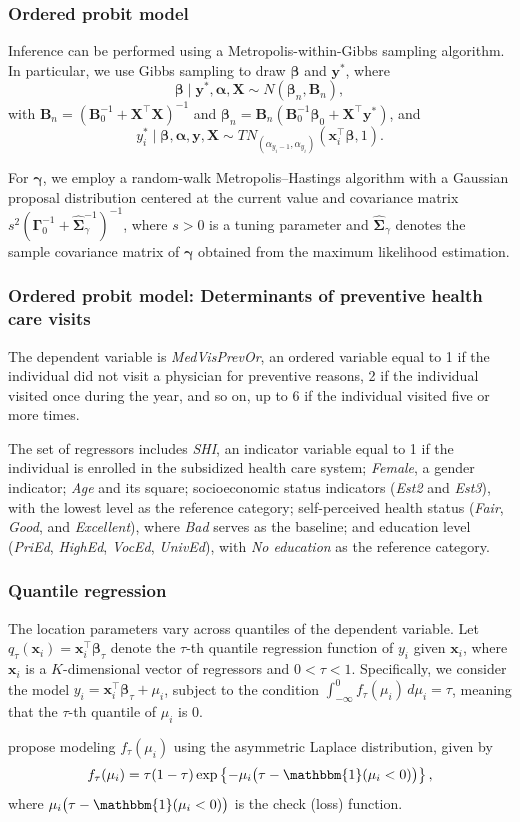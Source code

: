 \documentclass[12pt, compress]{beamer}
\begin{document}
\begin{frame}
	\frametitle{Ordered probit model}
Inference can be performed using a Metropolis-within-Gibbs sampling algorithm. In particular, we use Gibbs sampling to draw $\bm{\beta}$ and $\bm{y}^*$, where
\[
\bm{\beta} \mid \bm{y}^*, \bm{\alpha}, \bm{X} \sim N(\bm{\beta}_n, \bm{B}_n),
\]
with $\bm{B}_n = (\bm{B}_0^{-1} + \bm{X}^{\top}\bm{X})^{-1}$ and $\bm{\beta}_n = \bm{B}_n(\bm{B}_0^{-1}\bm{\beta}_0 + \bm{X}^{\top}\bm{y}^*)$, and
\[
y_i^* \mid \bm{\beta}, \bm{\alpha}, \bm{y}, \bm{X} \sim TN_{(\alpha_{y_i-1}, \alpha_{y_i})}(\bm{x}_i^{\top}\bm{\beta}, 1).
\]

For $\bm{\gamma}$, we employ a random-walk Metropolis--Hastings algorithm with a Gaussian proposal distribution centered at the current value and covariance matrix $s^2(\bm{\Gamma}_0^{-1} + \hat{\bm{\Sigma}}_{\gamma}^{-1})^{-1}$, where $s > 0$ is a tuning parameter and $\hat{\bm{\Sigma}}_{\gamma}$ denotes the sample covariance matrix of $\bm{\gamma}$ obtained from the maximum likelihood estimation.
\end{frame}

\begin{frame}
	\frametitle{Ordered probit model: Determinants of preventive health care visits}
The dependent variable is \textit{MedVisPrevOr}, an ordered variable equal to 1 if the individual did not visit a physician for preventive reasons, 2 if the individual visited once during the year, and so on, up to 6 if the individual visited five or more times.

The set of regressors includes \textit{SHI}, an indicator variable equal to 1 if the individual is enrolled in the subsidized health care system; \textit{Female}, a gender indicator; \textit{Age} and its square; socioeconomic status indicators (\textit{Est2} and \textit{Est3}), with the lowest level as the reference category; self-perceived health status (\textit{Fair}, \textit{Good}, and \textit{Excellent}), where \textit{Bad} serves as the baseline; and education level (\textit{PriEd}, \textit{HighEd}, \textit{VocEd}, \textit{UnivEd}), with \textit{No education} as the reference category.
\end{frame}

\begin{frame}
	\frametitle{Quantile regression}
The location parameters vary across quantiles of the dependent variable. Let $q_{\tau}(\bm{x}_i) = \bm{x}_i^{\top} \bm{\beta}_{\tau}$ denote the $\tau$-th quantile regression function of $y_i$ given $\bm{x}_i$, where $\bm{x}_i$ is a $K$-dimensional vector of regressors and $0 < \tau < 1$. Specifically, we consider the model $y_i = \bm{x}_i^{\top} \bm{\beta}_{\tau} + \mu_i$, subject to the condition $\int_{-\infty}^{0} f_{\tau}(\mu_i) \, d\mu_i = \tau$, meaning that the $\tau$-th quantile of $\mu_i$ is 0.

\cite{Kozumi2011} propose modeling $f_{\tau}(\mu_i)$ using the asymmetric Laplace distribution, given by 
\[
f_{\tau}(\mu_i) = \tau(1 - \tau) \exp\left\{- \mu_i \big(\tau - \mathbbm{1}(\mu_i < 0)\big) \right\},
\]
where $\mu_i \big(\tau - \mathbbm{1}(\mu_i < 0)\big)$ is the check (loss) function.
\end{frame}
\end{document}
